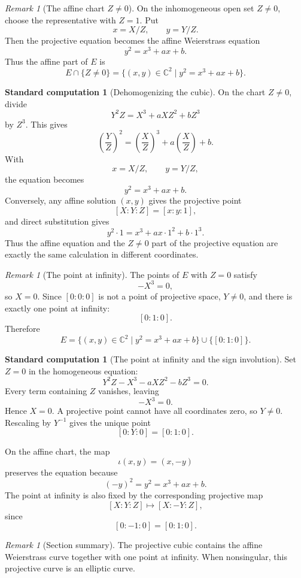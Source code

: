 \documentclass[11pt]{article}
\theoremstyle{definition}
\newtheorem{calculation}[theorem]{Standard computation}
\theoremstyle{remark}
\newtheorem{remark}[theorem]{Remark}
\newcommand{\C}{\mathbb{C}}
\begin{document}
\begin{remark}[The affine chart \(Z\neq 0\)]
On the inhomogeneous open set \(Z\neq 0\), choose the representative with
\(Z=1\).  Put
\[
  x=X/Z,\qquad y=Y/Z.
\]
Then the projective equation becomes the affine Weierstrass equation
\[
  y^2=x^3+ax+b.
\]
Thus the affine part of \(E\) is
\[
  E\cap\{Z\neq 0\}
  =
  \{(x,y)\in \C^2\mid y^2=x^3+ax+b\}.
\]
\end{remark}

\begin{calculation}[Dehomogenizing the cubic]
On the chart \(Z\neq 0\), divide
\[
  Y^2Z=X^3+aXZ^2+bZ^3
\]
by \(Z^3\).  This gives
\[
  \left(\frac{Y}{Z}\right)^2
  =
  \left(\frac{X}{Z}\right)^3
  +a\left(\frac{X}{Z}\right)+b.
\]
With
\[
  x=X/Z,\qquad y=Y/Z,
\]
the equation becomes
\[
  y^2=x^3+ax+b.
\]
Conversely, any affine solution \((x,y)\) gives the projective point
\[
  [X:Y:Z]=[x:y:1],
\]
and direct substitution gives
\[
  y^2\cdot 1=x^3+a x\cdot 1^2+b\cdot 1^3.
\]
Thus the affine equation and the \(Z\neq 0\) part of the projective equation
are exactly the same calculation in different coordinates.
\end{calculation}

\begin{remark}[The point at infinity]
The points of \(E\) with \(Z=0\) satisfy
\[
  -X^3=0,
\]
so \(X=0\).  Since \([0:0:0]\) is not a point of projective space, \(Y\neq 0\),
and there is exactly one point at infinity:
\[
  [0:1:0].
\]
Therefore
\[
  E=
  \{(x,y)\in \C^2\mid y^2=x^3+ax+b\}\cup\{[0:1:0]\}.
\]
\end{remark}

\begin{calculation}[The point at infinity and the sign involution]
Set \(Z=0\) in the homogeneous equation:
\[
  Y^2Z-X^3-aXZ^2-bZ^3=0.
\]
Every term containing \(Z\) vanishes, leaving
\[
  -X^3=0.
\]
Hence \(X=0\).  A projective point cannot have all coordinates zero, so
\(Y\neq 0\).  Rescaling by \(Y^{-1}\) gives the unique point
\[
  [0:Y:0]=[0:1:0].
\]

On the affine chart, the map
\[
  \iota(x,y)=(x,-y)
\]
preserves the equation because
\[
  (-y)^2=y^2=x^3+ax+b.
\]
The point at infinity is also fixed by the corresponding projective map
\[
  [X:Y:Z]\longmapsto [X:-Y:Z],
\]
since
\[
  [0:-1:0]=[0:1:0].
\]
\end{calculation}

\begin{remark}[Section summary]
The projective cubic contains the affine Weierstrass curve together with one
point at infinity.  When nonsingular, this projective curve is an elliptic
curve.
\end{remark}
\end{document}
